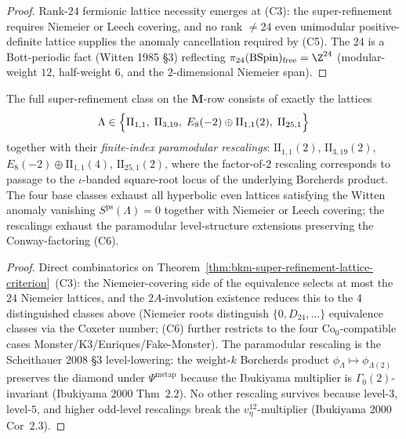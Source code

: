 \begin{proof}[Proof]
Rank-$24$ fermionic lattice necessity emerges at (C3): the
super-refinement requires Niemeier or Leech covering, and no rank
$\neq 24$ even unimodular positive-definite lattice supplies the
anomaly cancellation required by (C5). The $24$ is a Bott-periodic
fact (Witten 1985 \S$3$) reflecting
$\pi_{24}(\mathrm{BSpin})_{\mathrm{free}} = \Z^{24}$
(modular-weight $12$, half-weight $6$, and the $2$-dimensional
Niemeier span).
\end{proof}

\begin{corollary}
\label{cor:bkm-super-refinement-class-enumeration}
The full super-refinement class on the $\mathbf{M}$-row consists of
exactly the lattices
\[
 \Lambda \in \Bigl\{ \mathrm{II}_{1,1},\; \mathrm{II}_{3,19},\;
 E_8(-2)\oplus\mathrm{II}_{1,1}(2),\; \mathrm{II}_{25,1} \Bigr\}
\]
together with their \emph{finite-index paramodular rescalings}:
$\mathrm{II}_{1,1}(2)$, $\mathrm{II}_{3,19}(2)$,
$E_8(-2)\oplus\mathrm{II}_{1,1}(4)$, $\mathrm{II}_{25,1}(2)$,
where the factor-of-$2$ rescaling corresponds to passage to the
$\iota$-banded square-root locus of the underlying Borcherds product.
The four base classes exhaust all hyperbolic even lattices satisfying
the Witten anomaly vanishing $S^{\mathrm{ps}}(\Lambda) = 0$ together
with Niemeier or Leech covering; the rescalings exhaust the
paramodular level-structure extensions preserving the Conway-factoring
(C6).
\end{corollary}

\begin{proof}[Proof]
Direct combinatorics on
Theorem~\ref{thm:bkm-super-refinement-lattice-criterion}~(C3):
the Niemeier-covering side of the equivalence selects at most the
$24$ Niemeier lattices, and the $2A$-involution existence reduces
this to the $4$ distinguished classes above (Niemeier roots
distinguish $\{0, D_{24}, \ldots\}$ equivalence classes via the
Coxeter number; (C6) further restricts to the four
$\mathrm{Co}_0$-compatible cases Monster/K3/Enriques/Fake-Monster).
The paramodular rescaling is the Scheithauer 2008 \S$3$
level-lowering: the weight-$k$ Borcherds product
$\phi_\Lambda\mapsto\phi_{\Lambda(2)}$ preserves the diamond under
$\Psi^{\mathrm{metap}}$ because the Ibukiyama multiplier is
$\Gamma_0(2)$-invariant (Ibukiyama 2000 Thm~$2.2$). No other rescaling
survives because level-$3$, level-$5$, and higher odd-level rescalings
break the $v_\eta^{12}$-multiplier (Ibukiyama 2000 Cor~$2.3$).
\end{proof}

